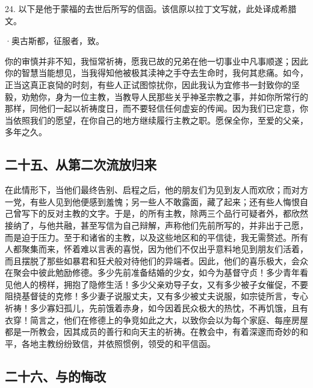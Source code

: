 24. 以下是他于蒙福的去世后所写的信函。该信原以拉丁文写就，此处译成希腊文。\par

·奥古斯都，征服者，致。\par

你的审慎并非不知，我恒常祈祷，愿我已故的兄弟在他一切事业中凡事顺遂；因此你的智慧当能想见，当我得知他被极其渎神之手夺去生命时，我何其悲痛。如今，正当这真正哀恸的时刻，有些人正试图惊扰你，因此我认为宜修书一封致你的坚毅，劝勉你，身为一位主教，当教导人民那些关乎神圣宗教之事，并如你所常行的那样，同他们一起以祈祷度日，而不要轻信任何虚妄的传闻。因为我们已定意，你当依照我们的愿望，在你自己的地方继续履行主教之职。愿保全你，至爱的父亲，多年之久。\par


\subsection{二十五、从第二次流放归来}

在此情形下，当他们最终告别、启程之后，他的朋友们为见到友人而欢欣；而对方一党，有些人见到他便感到羞愧；另一些人不敢露面，藏了起来；还有些人悔恨自己曾写下的反对主教的文字。于是，的所有主教，除两三个品行可疑者外，都欣然接纳了，与他共融，甚至写信为自己辩解，声称他们先前所写的，并非出于己愿，而是迫于压力。至于和诸省的主教，以及这些地区和的平信徒，我无需赘述。所有人都聚集而来，怀着难以言表的喜悦，因为他们不仅出乎意料地见到朋友们活着，而且摆脱了那些如暴君和狂犬般对待他们的异端者。因此，他们的喜乐极大，会众在聚会中彼此勉励修德。多少先前准备结婚的少女，如今为基督守贞！多少青年看见他人的榜样，拥抱了隐修生活！多少父亲劝导子女，又有多少被子女催促，不要阻挠基督徒的克修！多少妻子说服丈夫，又有多少被丈夫说服，如宗徒所言，专心祈祷！多少寡妇孤儿，先前饿着赤身，如今因着民众极大的热忱，不再饥饿，且有衣穿！简言之，他们在修德上的争竞如此之大，以致你会以为每个家庭、每座房屋都是一所教会，因其成员的善行和向天主的祈祷。在教会中，有着深邃而奇妙的和平，各地主教纷纷致信，并依照惯例，领受的和平信函。\par


\subsection{二十六、与的悔改}

